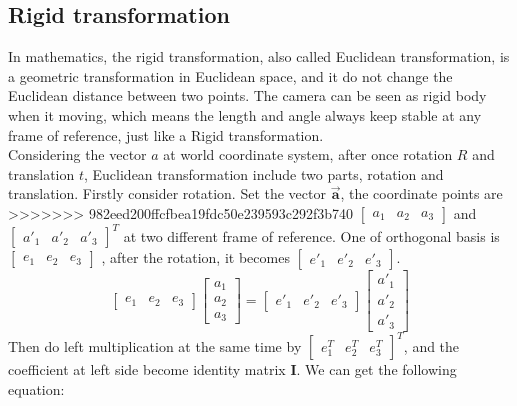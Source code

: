 \subsection{Rigid transformation}
In mathematics, the rigid transformation, also called Euclidean transformation, is a geometric transformation in  Euclidean space, and it do not change the Euclidean distance between two points. The camera can be seen as rigid body when it moving, which means the length and angle always keep stable at any frame of reference, just like a Rigid transformation.\\
Considering the vector $a$ at world coordinate system, after once rotation $R$ and translation $t$, 
Euclidean transformation include two parts, rotation and translation. Firstly consider rotation. Set the vector $\pmb{\vec{a}}$, the coordinate points are
>>>>>>> 982eed200ffcfbea19fdc50e239593c292f3b740
$
    \begin{bmatrix} 
        a_1 & a_2 & a_3
    \end{bmatrix} 
$
and 
$
\left[
\begin{matrix} 
    a'_1 & a'_2 & a'_3
\end{matrix} 
\right]^T
$ at two different frame of reference. One of orthogonal basis is 
$
\begin{bmatrix} 
    e_1 & e_2 & e_3
\end{bmatrix} 
$
, after the rotation, it becomes 
$
    \begin{bmatrix} 
        e'_1 & e'_2 & e'_3
    \end{bmatrix} 
$.
$$
   \begin{bmatrix}
        e_1 & e_2 & e_3
   \end{bmatrix} 
   \begin{bmatrix}
    a_1\\
    a_2\\
    a_3
    \end{bmatrix}
    =
    \begin{bmatrix}
    e'_1 & e'_2 & e'_3
    \end{bmatrix}
    \begin{bmatrix}
    a'_1\\
    a'_2\\
    a'_3
    \end{bmatrix}
$$
Then do left multiplication at the same time by 
$
    \left[
    \begin{matrix}
    e_1^T & e_2^T & e_3^T
    \end{matrix}
    \right]^T
$, and the coefficient at left side become identity matrix $\pmb{I}$. We can get the following equation:

